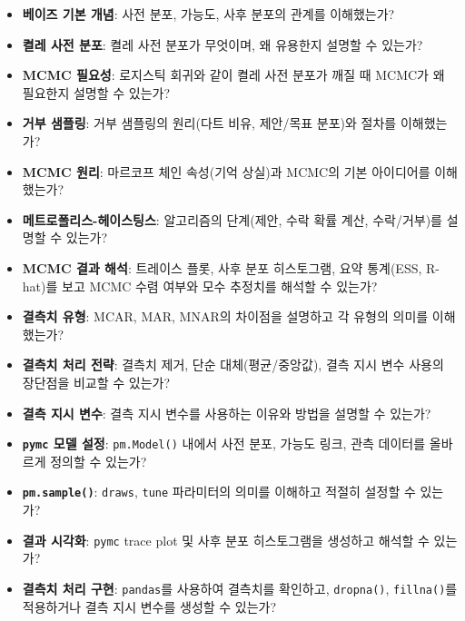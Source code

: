 \documentclass[11pt,a4paper]{article}
\theoremstyle{definition}
\begin{document}
\begin{infobox}[title=학습 점검 체크리스트]
\begin{itemize}
    \item \textbf{베이즈 기본 개념}: 사전 분포, 가능도, 사후 분포의 관계를 이해했는가?
    \item \textbf{켤레 사전 분포}: 켤레 사전 분포가 무엇이며, 왜 유용한지 설명할 수 있는가?
    \item \textbf{MCMC 필요성}: 로지스틱 회귀와 같이 켤레 사전 분포가 깨질 때 MCMC가 왜 필요한지 설명할 수 있는가?
    \item \textbf{거부 샘플링}: 거부 샘플링의 원리(다트 비유, 제안/목표 분포)와 절차를 이해했는가?
    \item \textbf{MCMC 원리}: 마르코프 체인 속성(기억 상실)과 MCMC의 기본 아이디어를 이해했는가?
    \item \textbf{메트로폴리스-헤이스팅스}: 알고리즘의 단계(제안, 수락 확률 계산, 수락/거부)를 설명할 수 있는가?
    \item \textbf{MCMC 결과 해석}: 트레이스 플롯, 사후 분포 히스토그램, 요약 통계(ESS, R-hat)를 보고 MCMC 수렴 여부와 모수 추정치를 해석할 수 있는가?
    \item \textbf{결측치 유형}: MCAR, MAR, MNAR의 차이점을 설명하고 각 유형의 의미를 이해했는가?
    \item \textbf{결측치 처리 전략}: 결측치 제거, 단순 대체(평균/중앙값), 결측 지시 변수 사용의 장단점을 비교할 수 있는가?
    \item \textbf{결측 지시 변수}: 결측 지시 변수를 사용하는 이유와 방법을 설명할 수 있는가?
\end{itemize}
\end{infobox}

\begin{infobox}[title=코드 활용 체크리스트]
\begin{itemize}
    \item \textbf{\texttt{pymc} 모델 설정}: \texttt{pm.Model()} 내에서 사전 분포, 가능도 링크, 관측 데이터를 올바르게 정의할 수 있는가?
    \item \textbf{\texttt{pm.sample()}}: \texttt{draws}, \texttt{tune} 파라미터의 의미를 이해하고 적절히 설정할 수 있는가?
    \item \textbf{결과 시각화}: \texttt{pymc} trace plot 및 사후 분포 히스토그램을 생성하고 해석할 수 있는가?
    \item \textbf{결측치 처리 구현}: \texttt{pandas}를 사용하여 결측치를 확인하고, \texttt{dropna()}, \texttt{fillna()}를 적용하거나 결측 지시 변수를 생성할 수 있는가?
\end{itemize}
\end{infobox}
\end{document}
